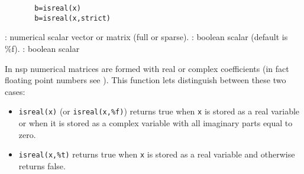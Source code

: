 


\begin{mandesc}
\end{mandesc}


\begin{calling_sequence}
    \begin{verbatim}
       b=isreal(x)  
       b=isreal(x,strict)  
    \end{verbatim}
\end{calling_sequence}

\begin{parameters}
  \begin{varlist}
   : numerical scalar vector or matrix (full or sparse).
   : boolean scalar (default is \%f).
   : boolean scalar
  \end{varlist}
\end{parameters}

\begin{mandescription}
In nsp numerical matrices are formed with real or complex coefficients
(in fact floating point numbers see
). This function
lets distinguish between these two cases:
\begin{itemize}
\item \verb!isreal(x)! (or \verb!isreal(x,%f)!) returns true when 
\verb!x! is stored as a real variable or when it is stored 
as a complex variable with all imaginary parts equal to zero. 
\item \verb!isreal(x,%t)! returns true when \verb!x! is stored as a real
variable and otherwise returns false.
\end{itemize}

\end{mandescription}

\begin{examples}

\begin{program}
\end{program}

\end{examples}

